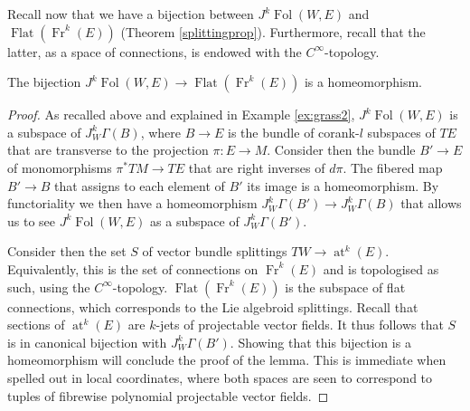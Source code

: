 \documentclass[10pt]{amsart}
\newcommand{\FolObj}{{\operatorname{Fol}}}
\newcommand{\FlatObj}{{\operatorname{Flat}}}
\newcommand{\Fr}{{\operatorname{Fr}}}
\DeclareMathOperator{\at}{at}
\numberwithin{theoremalpha}{section}
\numberwithin{equation}{section}
\numberwithin{definition}{section}
\numberwithin{theorem}{section}
\numberwithin{proposition}{section}
\numberwithin{lemma}{section}
\numberwithin{example}{section}
\numberwithin{remark}{section}
\numberwithin{corollary}{section}
\numberwithin{question}{section}
\numberwithin{problem}{section}
\numberwithin{assumption}{section}
\theoremstyle{named}
\numberwithin{equation}{section}
\begin{document}
Recall now that we have a bijection between $J^{k}\FolObj(W,E)$ and $\FlatObj(\Fr^k(E))$ (Theorem \ref{splittingprop}). Furthermore, recall that the latter, as a space of connections, is endowed with the $C^\infty$-topology.
\begin{lemma} \label{lem:canident}
The bijection $J^{k}\FolObj(W,E) \rightarrow \FlatObj(\Fr^k(E))$ is a homeomorphism.
\end{lemma}
\begin{proof}
As recalled above and explained in Example \ref{ex:grass2}, $J^{k}\FolObj(W,E)$ is a subspace of $J^k_W\Gamma(B)$, where $B \rightarrow E$ is the bundle of corank-$l$ subspaces of $TE$ that are transverse to the projection $\pi: E \rightarrow M$. Consider then the bundle $B' \rightarrow E$ of monomorphisms $\pi^*TM \rightarrow TE$ that are right inverses of $d\pi$. The fibered map $B' \rightarrow B$ that assigns to each element of $B'$ its image is a homeomorphism. By functoriality we then have a homeomorphism $J^k_W\Gamma(B') \rightarrow J^k_W\Gamma(B)$ that allows us to see $J^{k}\FolObj(W,E)$ as a subspace of $J^k_W\Gamma(B')$. 

Consider then the set $S$ of vector bundle splittings $TW \rightarrow \at^k(E)$. Equivalently, this is the set of connections on $\Fr^k(E)$ and is topologised as such, using the $C^\infty$-topology. $\FlatObj(\Fr^k(E))$ is the subspace of flat connections, which corresponds to the Lie algebroid splittings. Recall that sections of $\at^k(E)$ are $k$-jets of projectable vector fields. It thus follows that $S$ is in canonical bijection with $J^k_W\Gamma(B')$. Showing that this bijection is a homeomorphism will conclude the proof of the lemma. This is immediate when spelled out in local coordinates, where both spaces are seen to correspond to tuples of fibrewise polynomial projectable vector fields. 
\end{proof}
\end{document}
